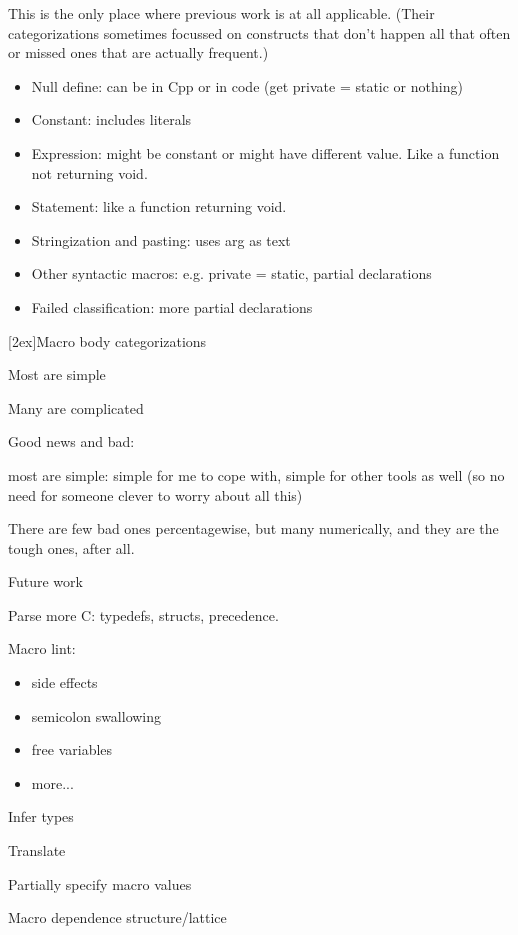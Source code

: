 \documentclass{slides}
\def\slidetitle#1{\begin{center}\large #1 \end{center}}
\def\raisedslidetitle#1{\centerline{\raisebox{1.5in}[2ex]{\large #1}}}
\def\slbreak{\\ \strut\hspace{1em}}
\begin{document}
\begin{note}
This is the only place where previous work is at all applicable.
(Their categorizations sometimes focussed on constructs that don't happen
all that often or missed ones that are actually frequent.)

\vspace{-.5in}
\begin{itemize}\itemsep 0pt \parskip 0pt
\item Null define: can be in Cpp or in code (get private = static or nothing)
\item Constant: includes literals
\item Expression: might be constant or might have different value.  Like a
function not returning void.
\item Statement: like a function returning void.
\item Stringization and pasting: uses arg as text
\item Other syntactic macros: e.g. private = static, partial declarations
\item Failed classification: more partial declarations
\end{itemize}

\end{note}

\begin{slide}
\raisedslidetitle{Macro body categorizations}

\centerline{}

Most are simple \slbreak
Many are complicated

\end{slide}

\begin{note}
Good news and bad: \slbreak
most are simple:  simple for me to cope with, simple for other tools as
well (so no need for someone clever to worry about all this) \slbreak
There are few bad ones percentagewise, but many numerically, and they are
the tough ones, after all.
\end{note}


\begin{slide}
\slidetitle{Future work}

Parse more C:  typedefs, structs, precedence.

Macro lint:
\vspace{-.5in}
\begin{itemize}\itemsep 0pt \parskip 0pt
\item side effects
\item semicolon swallowing
\item free variables
\item more...
\end{itemize}

Infer types

Translate

Partially specify macro values

Macro dependence structure/lattice

\end{slide}
\end{document}
